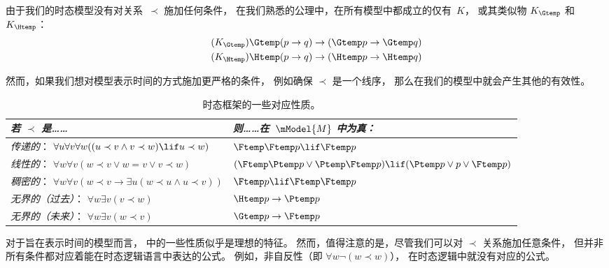 \documentclass[../../../include/open-logic-section]{subfiles}
\begin{document}


由于我们的时态模型没有对关系~$\prec$ 施加任何条件，
在我们熟悉的公理中，在所有模型中都成立的仅有~$K$，
或其类似物 $K_{\Gtemp}$ 和~$K_{\Htemp}$：\begin{align*}
\tag{$K_{\Gtemp}$}  \Gtemp (p \to q) & \to (\Gtemp p \to \Gtemp q)\\
\tag{$K_{\Htemp}$}  \Htemp (p \to q) & \to (\Htemp p \to \Htemp q)
\end{align*}

然而，如果我们想对模型表示时间的方式施加更严格的条件，
例如确保 $\prec$ 是一个线序，
那么在我们的模型中就会产生其他的有效性。

\begin{table}[t]
  \begin{tabular}{| p{} || p{} |}
    \hline
    {\emph{若 $\prec$ 是……}} & {\emph{则……在~$\mModel{M}$ 中为真：}} \\
    \hline \hline
    \emph{传递的}： \newline
    $\forall u \forall v \forall w ((u \prec v \land v \prec w) \lif u \prec w)$ &
    $\Ftemp \Ftemp p \lif \Ftemp p$  \\
    \hline
    \emph{线性的}： \newline
    $\forall w \forall v (w \prec v \lor w = v \lor v \prec w)$ &
    $(\Ftemp \Ptemp  p \lor \Ptemp \Ftemp p) \lif (\Ptemp p \lor p \lor \Ftemp p)$\\
    \hline
    \emph{稠密的}： \newline
    $\forall w \forall v (w \prec v \to \exists u(w \prec u \land u \prec v))$ &
    $\Ftemp p \lif \Ftemp \Ftemp p$ \\
    \hline
    \emph{无界的（过去）}： \newline
    $\forall w \exists v( v \prec w)$ &
    $\Htemp p \to \Ptemp p$ \\
    \hline
    \emph{无界的（未来）}： \newline
    $\forall w \exists v( w \prec v)$ &
    $\Gtemp p \to \Ftemp p$ \\
    \hline
  \end{tabular}
  \caption{时态框架的一些对应性质。}
\end{table}

对于旨在表示时间的模型而言，
 中的一些性质似乎是理想的特征。
然而，值得注意的是，尽管我们可以对 $\prec$ 关系施加任意条件，
但并非所有条件都对应着能在时态逻辑语言中表达的公式。
例如，非自反性（即 $\forall w \lnot (w \prec w)$），
在时态逻辑中就没有对应的公式。
\end{document}
